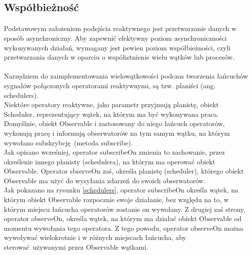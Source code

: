 \documentclass[12pt,oneside,a4paper]{report}
\begin{document}
\subsection{Współbieżność}
\paragraph{}Podstawowym założeniem podejścia reaktywnego jest przetwarzanie danych w sposób asynchroniczny. Aby zapewnić efektywny poziom asynchroniczności wykonywanych działań, wymagany jest pewien poziom współbieżności, czyli przetwarzania danych w oparciu o współistnienie wielu wątków lub procesów.
\paragraph{}
Narzędziem do zaimplementowania wielowątkowości podczas tworzenia łańcuchów sygnałów połączonych operatorami reaktywnymi, są tzw. planiści (ang. schedulers).\\
Niektóre operatory reaktywne, jako parametr przyjmują planistę, obiekt Scheduler, reprezentujący wątek, na którym ma być wykonywana praca.\\
Domyślnie, obiekt Observable i zastosowany do niego łańcuch operatorów, wykonują pracę i informują obserwatorów na tym samym wątku, na którym wywołano subskrybcję (metoda subscribe).\\
Jak opisano wcześniej, operator subscribeOn zmienia to zachowanie, przez określenie innego planisty (schedulera), na którym ma operować obiekt Observable. Operator sbserveOn zaś, określa planistę (scheduler), którego obiekt Observable ma użyć do wysyłania zdarzeń do swoich obserwatorów.\\
Jak pokazano na rysunku \ref{schedulers}, operator subscribeOn określa wątek, na którym obiekt Observable rozpocznie swoje działanie, bez względu na to, w którym miejscu łańcucha operatorów zostanie on wywołany. Z drugiej zaś strony, operator observeOn, określa wątek, na którym ma działać obiekt Observable od momentu wywołania tego operatora. Z tego powodu, operator observeOn można wywoływać wielokrotnie i w różnych miejscach łańcucha, aby sterować używanymi przez Observable wątkami. 
\end{document}
